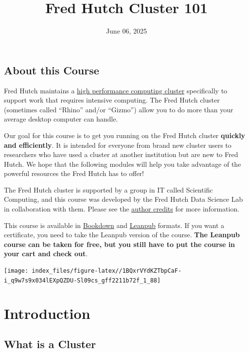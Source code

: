 \documentclass[
]{book}
\title{Fred Hutch Cluster 101}
\author{}
\date{\vspace{-2.5em}June 06, 2025}
\begin{document}
\maketitle

{
\setcounter{tocdepth}{1}
\tableofcontents
}
\hypertarget{about-this-course}{%
\chapter*{About this Course}\label{about-this-course}}

Fred Hutch maintains a \href{https://en.wikipedia.org/wiki/HPCC}{high performance computing cluster} specifically to support work that requires intensive computing. The Fred Hutch cluster (sometimes called ``Rhino'' and/or ``Gizmo'') allow you to do more than your average desktop computer can handle.

Our goal for this course is to get you running on the Fred Hutch cluster \textbf{quickly and efficiently}. It is intended for everyone from brand new cluster users to researchers who have used a cluster at another institution but are new to Fred Hutch. We hope that the following modules will help you take advantage of the powerful resources the Fred Hutch has to offer!

The Fred Hutch cluster is supported by a group in IT called Scientific Computing, and this course was developed by the Fred Hutch Data Science Lab in collaboration with them. Please see the \protect\hyperlink{about-the-authors}{author credits} for more information.

This course is available in \href{https://hutchdatascience.org/FH_Cluster_Guide}{Bookdown} and \href{https://leanpub.com/courses/fredhutch/fredhutchcluster101}{Leanpub} formats. If you want a certificate, you need to take the Leanpub version of the course. \textbf{The Leanpub course can be taken for free, but you still have to put the course in your cart and check out}.

\texttt{[image: index\_files/figure-latex//1BQxrVYdKZTbpCaF-i\_q9w7s9x034lEXpQZDU-Sl09cs\_gff2211b72f\_1\_88]}

\hypertarget{part-introduction}{%
\part*{Introduction}\label{part-introduction}}

\hypertarget{what-is-a-cluster}{%
\chapter{What is a Cluster}\label{what-is-a-cluster}}
\end{document}
